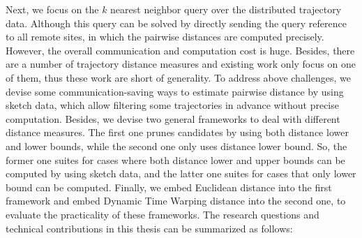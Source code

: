  Next, we focus on the $k$ nearest neighbor query over the distributed trajectory data.
Although this query can be solved by directly sending the query reference to all remote sites, in which the pairwise distances are computed precisely.
However, the overall communication  and computation cost is huge.
Besides, there are a number of  trajectory distance  measures and existing work only focus on  one of them, thus these work are short of generality. 
To address above challenges, 
 we devise some communication-saving ways to estimate pairwise distance by using sketch data,
 which allow filtering some trajectories in advance without precise computation.
 Besides, we devise two general frameworks to deal with different distance measures. The first one prunes candidates by using  both  distance lower and lower bounds, while the second one only uses  distance lower bound. So, the former one suites for cases where both distance lower and upper bounds can be computed by using sketch data, and the latter one suites for  cases that only  lower bound can be  computed.
 Finally, we embed Euclidean distance into the first framework and embed Dynamic Time Warping distance into the second one, to evaluate the practicality of these frameworks.
The research questions and technical contributions in this thesis can be summarized as follows:

